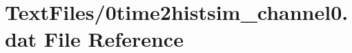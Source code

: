 \hypertarget{0time2histsim__channel0_8dat}{}\section{Text\+Files/0time2histsim\+\_\+channel0.dat File Reference}
\label{0time2histsim__channel0_8dat}
